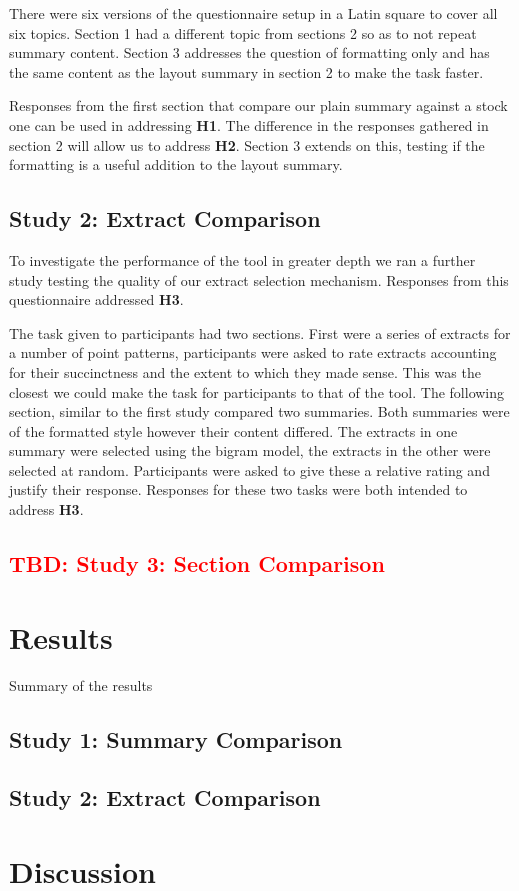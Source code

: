       There were six versions of the questionnaire setup in a Latin square to cover all six topics. Section 1 had a different topic from sections 2 so as to not repeat summary content. Section 3 addresses the question of formatting only and has the same content as the layout summary in section 2 to make the task faster.

      Responses from the first section that compare our plain summary against a stock one can be used in addressing \textbf{H1}. The difference in the responses gathered in section 2 will allow us to address \textbf{H2}. Section 3 extends on this, testing if the formatting is a useful addition to the layout summary.

    \tocless\subsection{Study 2: Extract Comparison}
      To investigate the performance of the tool in greater depth we ran a further study testing the quality of our extract selection mechanism. Responses from this questionnaire addressed \textbf{H3}.

      The task given to participants had two sections. First were a series of extracts for a number of point patterns, participants were asked to rate extracts accounting for their succinctness and the extent to which they made sense. This was the closest we could make the task for participants to that of the tool. The following section, similar to the first study compared two summaries. Both summaries were of the formatted style however their content differed. The extracts in one summary were selected using the bigram model, the extracts in the other were selected at random. Participants were asked to give these a relative rating and justify their response. Responses for these two tasks were both intended to address \textbf{H3}.

    \tocless\subsection{\textcolor{red}{TBD: Study 3: Section Comparison}}

  \section{Results}
    Summary of the results
    \subsection{Study 1: Summary Comparison}
    \subsection{Study 2: Extract Comparison}

  \section{Discussion}
